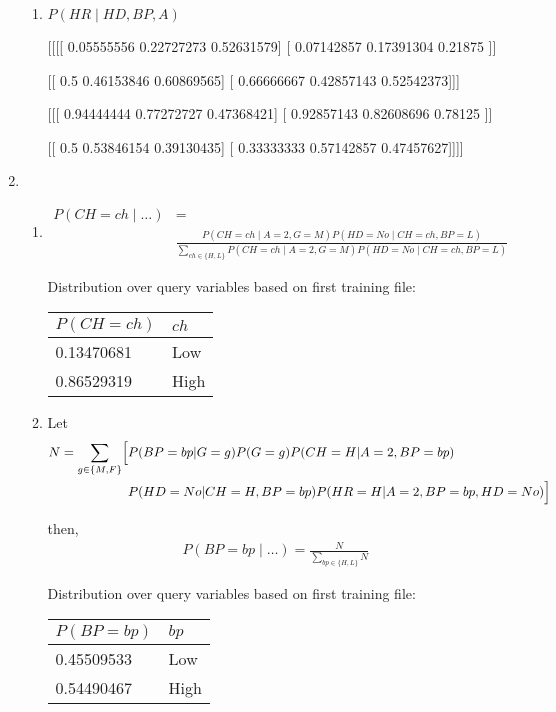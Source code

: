 \documentclass[12pt]{article}
\begin{document}
\begin{enumerate}
\begin{enumerate}
\item
$P(HR\mid HD,BP,A)$

[[[[ 0.05555556  0.22727273  0.52631579]
   [ 0.07142857  0.17391304  0.21875   ]]

  [[ 0.5         0.46153846  0.60869565]
   [ 0.66666667  0.42857143  0.52542373]]]


 [[[ 0.94444444  0.77272727  0.47368421]
   [ 0.92857143  0.82608696  0.78125   ]]

  [[ 0.5         0.53846154  0.39130435]
   [ 0.33333333  0.57142857  0.47457627]]]]
\end{enumerate}

\item %
\begin{enumerate}
\item

\begin{align*}
P(CH=ch\mid \ldots) &= \\
&\frac{P(CH=ch\mid A=2,G=M)P(HD=No\mid CH=ch,BP=L)}{\sum_{ch \in \{H,L\}}P(CH=ch\mid A=2,G=M)P(HD=No\mid CH=ch,BP=L)}
\end{align*}

Distribution over query variables based on first training file:

\begin{tabular}{ll}
$P(CH=ch)$ & $ch$ \\ \hline
0.13470681 & Low \\
0.86529319 & High
\end{tabular}

\item
Let
\begin{align*}
N = \sum_{g \in \{M,F\}}\Bigl[
&P(BP=bp|G=g)
P(G=g)
P(CH=H|A=2,BP=bp)\\
&P(HD=No|CH=H,BP=bp)
P(HR=H|A=2,BP=bp,HD=No)\Bigr]
\end{align*}

then,
\begin{align*}
P(BP=bp\mid \ldots) = \frac{N}{\sum_{bp\in\{H,L\}}N}
\end{align*}

Distribution over query variables based on first training file:

\begin{tabular}{ll}
$P(BP=bp)$ & $bp$ \\ \hline
0.45509533 & Low \\
0.54490467 & High
\end{tabular}

\end{enumerate}


\end{enumerate}
\end{document}
